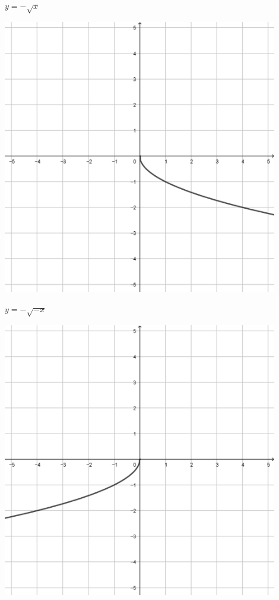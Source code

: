 \documentclass[a4paper]{oblivoir}
\begin{document}
\begin{minipage}{0.45\textwidth}\centering
\(y=-\sqrt x\)
\par\bigskip\includegraphics[width=0.9\textwidth]{img/5_irrational_3}
\end{minipage}
\begin{minipage}{0.45\textwidth}\centering
\(y=-\sqrt{-x}\)
\par\bigskip\includegraphics[width=0.9\textwidth]{img/5_irrational_4}
\end{minipage}\bigskip\bigskip\par
\end{document}
